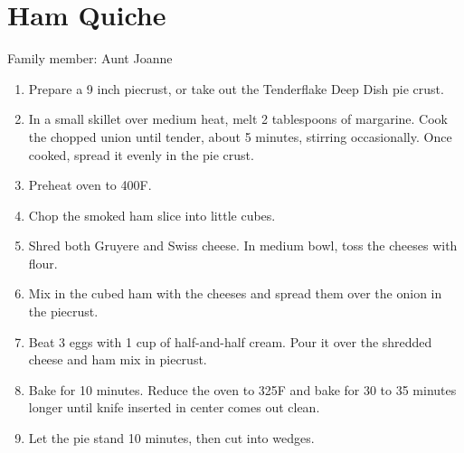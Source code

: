 \chapter{Ham Quiche}
\label{ch:hamquiche}

Family member: Aunt Joanne



\begin{enumerate}
    \item Prepare a 9 inch piecrust, or take out the Tenderflake Deep Dish pie crust.
    \item In a small skillet over medium heat, melt 2 tablespoons of margarine. Cook the chopped union until tender, about 5 minutes, stirring occasionally. Once cooked, spread it evenly in the pie crust.
    \item Preheat oven to 400\degree F.
    \item Chop the smoked ham slice into little cubes.
    \item Shred both Gruyere and Swiss cheese. In medium bowl, toss the cheeses with flour.
    \item Mix in the cubed ham with the cheeses and spread them over the onion in the piecrust.
    \item Beat 3 eggs with 1 cup of half-and-half cream. Pour it over the shredded cheese and ham mix in piecrust.
    \item Bake for 10 minutes. Reduce the oven to 325\degree F and bake for 30 to 35 minutes longer until knife inserted in center comes out clean.
    \item Let the pie stand 10 minutes, then cut into wedges.
\end{enumerate}